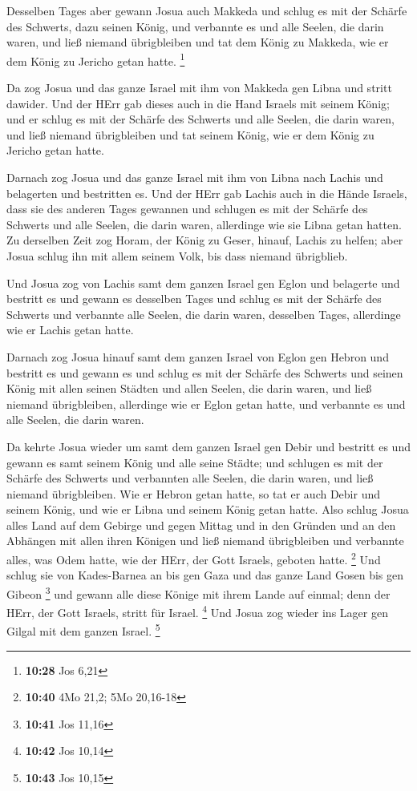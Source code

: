  Desselben Tages aber gewann Josua auch Makkeda und
schlug es mit der Schärfe des Schwerts, dazu seinen König, und verbannte
es und alle Seelen, die darin waren, und ließ niemand übrigbleiben und
tat dem König zu Makkeda, wie er dem König zu Jericho getan hatte.
\footnote{\textbf{10:28} Jos 6,21}

 Da zog Josua und das ganze Israel mit ihm von Makkeda
gen Libna und stritt dawider.  Und der HErr gab dieses
auch in die Hand Israels mit seinem König; und er schlug es mit der
Schärfe des Schwerts und alle Seelen, die darin waren, und ließ niemand
übrigbleiben und tat seinem König, wie er dem König zu Jericho getan
hatte.

 Darnach zog Josua und das ganze Israel mit ihm von Libna
nach Lachis und belagerten und bestritten es.  Und der
HErr gab Lachis auch in die Hände Israels, dass sie des anderen Tages
gewannen und schlugen es mit der Schärfe des Schwerts und alle Seelen,
die darin waren, allerdinge wie sie Libna getan hatten. 
Zu derselben Zeit zog Horam, der König zu Geser, hinauf, Lachis zu
helfen; aber Josua schlug ihn mit allem seinem Volk, bis dass niemand
übrigblieb.

 Und Josua zog von Lachis samt dem ganzen Israel gen
Eglon und belagerte und bestritt es  und gewann es
desselben Tages und schlug es mit der Schärfe des Schwerts und verbannte
alle Seelen, die darin waren, desselben Tages, allerdinge wie er Lachis
getan hatte.

 Darnach zog Josua hinauf samt dem ganzen Israel von
Eglon gen Hebron und bestritt es  und gewann es und
schlug es mit der Schärfe des Schwerts und seinen König mit allen seinen
Städten und allen Seelen, die darin waren, und ließ niemand
übrigbleiben, allerdinge wie er Eglon getan hatte, und verbannte es und
alle Seelen, die darin waren.

 Da kehrte Josua wieder um samt dem ganzen Israel gen
Debir und bestritt es  und gewann es samt seinem König
und alle seine Städte; und schlugen es mit der Schärfe des Schwerts und
verbannten alle Seelen, die darin waren, und ließ niemand übrigbleiben.
Wie er Hebron getan hatte, so tat er auch Debir und seinem König, und
wie er Libna und seinem König getan hatte.  Also schlug
Josua alles Land auf dem Gebirge und gegen Mittag und in den Gründen und
an den Abhängen mit allen ihren Königen und ließ niemand übrigbleiben
und verbannte alles, was Odem hatte, wie der HErr, der Gott Israels,
geboten hatte. \footnote{\textbf{10:40} 4Mo 21,2; 5Mo 20,16-18}
 Und schlug sie von Kades-Barnea an bis gen Gaza und das
ganze Land Gosen bis gen Gibeon \footnote{\textbf{10:41} Jos 11,16}
 und gewann alle diese Könige mit ihrem Lande auf einmal;
denn der HErr, der Gott Israels, stritt für Israel. \footnote{\textbf{10:42}
  Jos 10,14}  Und Josua zog wieder ins Lager gen Gilgal
mit dem ganzen Israel. \footnote{\textbf{10:43} Jos 10,15}

